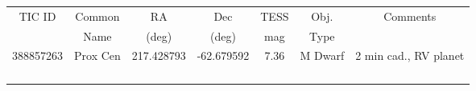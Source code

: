 \documentclass[letterpaper,11pt]{article}
\begin{document}
\begin{center}
\begin{tabular}{ | c | c | c | c | c | c | c | }
\hline
TIC ID          &      Common      &     RA             &      Dec          &      TESS       &       Obj.        &      Comments \\       
                    &      Name           &     (deg)          &      (deg)        &      mag         &       Type       &                         \\     
\hline
\hline
388857263  &  Prox Cen          &  217.428793  &  -62.679592  &  7.36             &    M Dwarf    & 2 min cad., RV planet \\ \hline
                    &                           &                       &                      &                      &                     &                                     \\ \hline
                    &                           &                       &                      &                      &                     &                                     \\ \hline
                    &                           &                       &                      &                      &                     &                                     \\ \hline
                    &                           &                       &                      &                      &                     &                                     \\ \hline
\end{tabular}
\end{center}   

\end{document}
